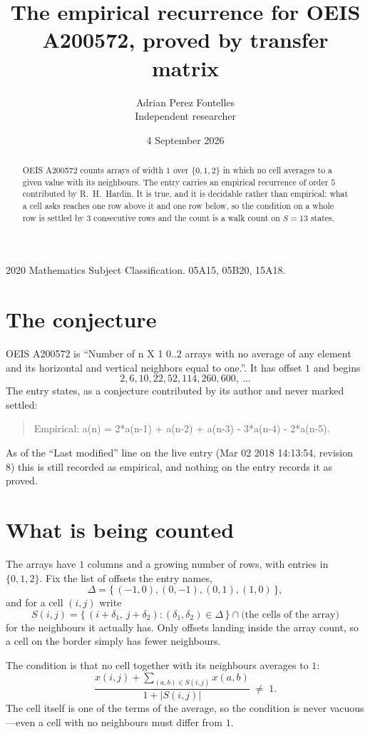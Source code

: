 \documentclass[11pt,a4paper]{article}
\title{The empirical recurrence for OEIS A200572, proved by transfer matrix}
\author{Adrian Perez Fontelles\\ \small Independent researcher}
\date{4 September 2026}
\theoremstyle{plain}
\theoremstyle{definition}
\begin{document}
\maketitle

\begin{abstract}
OEIS A200572 counts arrays of width $1$ over $\{0,1,2\}$ in which no cell averages to a given value with its neighbours. The entry carries an
empirical recurrence of order $5$ contributed by R.~H.~Hardin. It is true, and it is
decidable rather than empirical: what a cell asks reaches one row above
it and one row below, so the condition on a whole row is settled by
$3$ consecutive rows and the count is a walk count on $S=13$ states.
\end{abstract}

\noindent\small 2020 Mathematics Subject Classification. 05A15, 05B20, 15A18.\normalsize

\section{The conjecture}

OEIS A200572 is ``Number of n X 1 0..2 arrays with no average of any element and its horizontal and vertical neighbors equal to one.''. It has offset $1$ and begins
\[
2, 6, 10, 22, 52, 114, 260, 600,\ \dots
\]
The entry states, as a conjecture contributed by its author and never marked settled:
\begin{quote}
Empirical: a(n) = 2*a(n-1) + a(n-2) + a(n-3) - 3*a(n-4) - 2*a(n-5).
\end{quote}
As of the ``Last modified'' line on the live entry (Mar 02 2018 14:13:54, revision 8) this is still
recorded as empirical, and nothing on the entry records it as proved.

\section{What is being counted}

The arrays have $1$ columns and a growing number of rows, with entries in $\{0,1,2\}$. Fix the
list of offsets the entry names,
\[
\Delta=\{\,(-1,0), (0,-1), (0,1), (1,0)\,\},
\]
and for a cell $(i,j)$ write
\[
S(i,j)=\{\,(i+\delta_1,\,j+\delta_2) : (\delta_1,\delta_2)\in\Delta\,\}\cap
\text{(the cells of the array)}
\]
for the neighbours it actually has. Only offsets landing inside the array count, so a cell on
the border simply has fewer neighbours.

The condition is that no cell together with its neighbours averages to $1$:
\[
\frac{x(i,j)+\sum_{(a,b)\in S(i,j)}x(a,b)}{1+|S(i,j)|}\;\neq\;1 .
\]
The cell itself is one of the terms of the average, so the condition is never vacuous---even a cell with no neighbours must differ from $1$.
\end{document}
